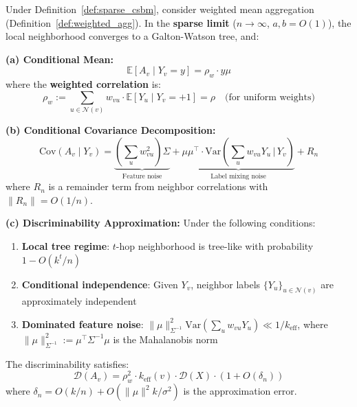 \begin{theorem}
\label{thm:agg_discriminability_rigorous}
Under Definition~\ref{def:sparse_csbm}, consider weighted mean aggregation (Definition~\ref{def:weighted_agg}). In the \textbf{sparse limit} ($n \to \infty$, $a, b = O(1)$), the local neighborhood converges to a Galton-Watson tree, and:

\textbf{(a) Conditional Mean:}
\begin{equation}
    \mathbb{E}[A_v \mid Y_v = y] = \rho_w \cdot y \mu
\end{equation}
where the \textbf{weighted correlation} is:
\begin{equation}
    \rho_w := \sum_{u \in \mathcal{N}(v)} w_{vu} \cdot \mathbb{E}[Y_u \mid Y_v = +1] = \rho \quad \text{(for uniform weights)}
\end{equation}

\textbf{(b) Conditional Covariance Decomposition:}
\begin{equation}
    \mathrm{Cov}(A_v \mid Y_v) = \underbrace{\left(\sum_{u} w_{vu}^2\right) \Sigma}_{\text{Feature noise}} + \underbrace{\mu \mu^\top \cdot \mathrm{Var}\left(\sum_{u} w_{vu} Y_u \,\Big|\, Y_v\right)}_{\text{Label mixing noise}} + R_n
\end{equation}
where $R_n$ is a remainder term from neighbor correlations with $\|R_n\| = O(1/n)$.

\textbf{(c) Discriminability Approximation:}
Under the following conditions:
\begin{enumerate}
    \item[(A1)] \textbf{Local tree regime}: $t$-hop neighborhood is tree-like with probability $1 - O(k^t/n)$
    \item[(A2)] \textbf{Conditional independence}: Given $Y_v$, neighbor labels $\{Y_u\}_{u \in \mathcal{N}(v)}$ are approximately independent
    \item[(A3)] \textbf{Dominated feature noise}: $\|\mu\|_{\Sigma^{-1}}^2 \mathrm{Var}(\sum_u w_{vu} Y_u) \ll 1 / k_{\mathrm{eff}}$, where $\|\mu\|_{\Sigma^{-1}}^2 := \mu^\top \Sigma^{-1} \mu$ is the Mahalanobis norm
\end{enumerate}
The discriminability satisfies:
\begin{equation}
    \mathcal{D}(A_v) = \rho_w^2 \cdot k_{\mathrm{eff}}(v) \cdot \mathcal{D}(X) \cdot (1 + O(\delta_n))
\end{equation}
where $\delta_n = O(k/n) + O(\|\mu\|^2 k / \sigma^2)$ is the approximation error.
\end{theorem}

